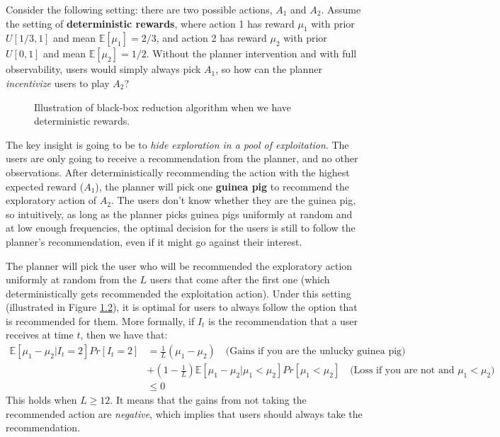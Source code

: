\documentclass[
  letterpaper,
  numbers=noenddot,
  DIV=11]{scrreprt}
\makeatletter
\newcommand*\pandocbounded[1]{%
  \sbox\pandoc@box{#1}%
  \Gscale@div\@tempa{\textheight}{\dimexpr\ht\pandoc@box+\dp\pandoc@box\relax}%
  \Gscale@div\@tempb{\linewidth}{\wd\pandoc@box}%
  \ifdim\@tempb\p@<\@tempa\p@\let\@tempa\@tempb\fi%
  \ifdim\@tempa\p@<\p@\scalebox{\@tempa}{\usebox\pandoc@box}%
  \else\usebox{\pandoc@box}%
  \fi%
}
\theoremstyle{plain}
\theoremstyle{definition}
\theoremstyle{plain}
\theoremstyle{remark}
\makeatother
\begin{document}
Consider the following setting: there are two possible actions, \(A_1\)
and \(A_2\). Assume the setting of \textbf{deterministic rewards}, where
action 1 has reward \(\mu_1\) with prior \(U[1/3, 1]\) and mean
\(\mathbb{E}[\mu_1] = 2/3\), and action 2 has reward \(\mu_2\) with
prior \(U[0, 1]\) and mean \(\mathbb{E}[\mu_2] = 1/2\). Without the
planner intervention and with full observability, users would simply
always pick \(A_1\), so how can the planner \emph{incentivize} users to
play \(A_2\)?

\begin{figure}

\centering{

\pandocbounded{\texttt{[image: src/Figures/guinea\_pig\_fig.png]}}

}

\caption{\label{fig-deterministic-guinea-pig}Illustration of black-box
reduction algorithm when we have deterministic rewards.}

\end{figure}%

The key insight is going to be to \emph{hide exploration in a pool of
exploitation}. The users are only going to receive a recommendation from
the planner, and no other observations. After deterministically
recommending the action with the highest expected reward (\(A_1\)), the
planner will pick one \textbf{guinea pig} to recommend the exploratory
action of \(A_2\). The users don't know whether they are the guinea pig,
so intuitively, as long as the planner picks guinea pigs uniformly at
random and at low enough frequencies, the optimal decision for the users
is still to follow the planner's recommendation, even if it might go
against their interest.

The planner will pick the user who will be recommended the exploratory
action uniformly at random from the \(L\) users that come after the
first one (which deterministically gets recommended the exploitation
action). Under this setting (illustrated in Figure
\hyperref[fig-deterministic-guinea-pig]{1.2}), it is optimal for users
to always follow the option that is recommended for them. More formally,
if \(I_t\) is the recommendation that a user receives at time \(t\),
then we have that: \[\begin{split}
    \mathbb{E}[\mu_1 - \mu_2 | I_t = 2] Pr[I_t = 2] &= \frac{1}{L} (\mu_1 - \mu_2) \quad \text{(Gains if you are the unlucky guinea pig)}\\
    &+ (1 - \frac{1}{L}) \mathbb{E}[\mu_1 - \mu_2 | \mu_1 < \mu_2] Pr[\mu_1 < \mu_2] \quad \text{(Loss if you are not and $\mu_1 < \mu_2$)}\\
    &\leq 0
\end{split}\] This holds when \(L \geq 12\). It means that the gains
from not taking the recommended action are \emph{negative}, which
implies that users should always take the recommendation.
\end{document}
